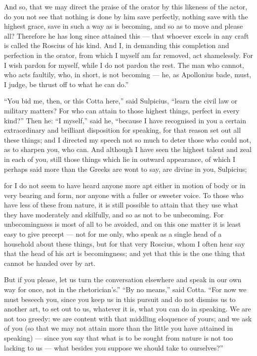  And so, that we may direct the praise of the orator by this likeness of the actor, do you not see that nothing is done by him save perfectly, nothing save with the highest grace, save in such a way as is becoming, and so as to move and please all? Therefore he has long since attained this — that whoever excels in any craft is called the Roscius of his kind. And I, in demanding this completion and perfection in the orator, from which I myself am far removed, act shamelessly. For I wish pardon for myself, while I do not pardon the rest. The man who cannot, who acts faultily, who, in short, is not becoming — he, as Apollonius bade, must, I judge, be thrust off to what he can do.''

 ``You bid me, then, or this Cotta here,'' said Sulpicius, ``learn the civil law or military matters? For who can attain to those highest things, perfect in every kind?'' Then he: ``I myself,'' said he, ``because I have recognised in you a certain extraordinary and brilliant disposition for speaking, for that reason set out all these things; and I directed my speech not so much to deter those who could not, as to sharpen you, who can. And although I have seen the highest talent and zeal in each of you, still those things which lie in outward appearance, of which I perhaps said more than the Greeks are wont to say, are divine in you, Sulpicius;

 for I do not seem to have heard anyone more apt either in motion of body or in very bearing and form, nor anyone with a fuller or sweeter voice. To those who have less of these from nature, it is still possible to attain that they use what they have moderately and skilfully, and so as not to be unbecoming. For unbecomingness is most of all to be avoided, and on this one matter it is least easy to give precept — not for me only, who speak as a single head of a household about these things, but for that very Roscius, whom I often hear say that the head of his art is becomingness; and yet that this is the one thing that cannot be handed over by art.

 But if you please, let us turn the conversation elsewhere and speak in our own way for once, not in the rhetorician's.'' ``By no means,'' said Cotta. ``For now we must beseech you, since you keep us in this pursuit and do not dismiss us to another art, to set out to us, whatever it is, what you can do in speaking. We are not too greedy: we are content with that middling eloquence of yours; and we ask of you (so that we may not attain more than the little you have attained in speaking) — since you say that what is to be sought from nature is not too lacking to us — what besides you suppose we should take to ourselves?''

